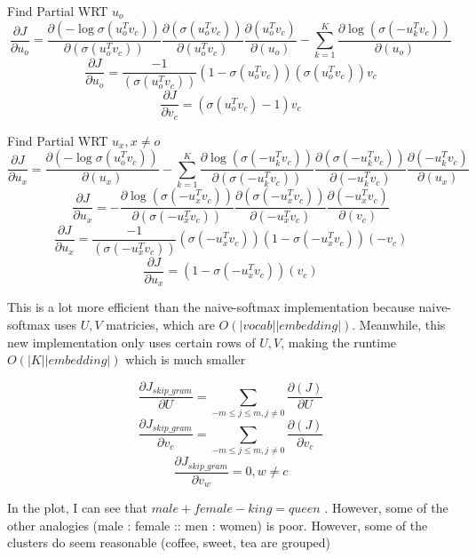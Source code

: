 \documentclass[11pt,largemargins]{homework}
\begin{document}
Find Partial WRT $u_o$ 
$$ \frac{\partial{J}}{\partial{u_o}} = \frac{\partial{(-\log{\sigma{(u_o^T v_c)}})}}{\partial{(\sigma{(u_o^T v_c)})}} \frac{{\partial{(\sigma{(u_o^T v_c)})}}}{\partial{(u_o^T v_c)}}\frac{\partial{(u_o^T v_c)}}{\partial{(u_o)}} - \sum_{k=1}^K \frac{\partial{\log{(\sigma{(-u_k^T v_c)})}}}{\partial{(u_o)}}
$$
$$ \frac{\partial{J}}{\partial{u_o}} = \frac{-1}{(\sigma{(u_o^T v_c)})} (1 - \sigma{(u_o^T v_c)})(\sigma{(u_o^T v_c)})v_c$$
$$ \frac{\partial{J}}{\partial{v_c}} = (\sigma{(u_o^T v_c)} - 1) v_c $$

Find Partial WRT $u_x, x \ne o$ 
$$ \frac{\partial{J}}{\partial{u_x}} = \frac{\partial{(-\log{\sigma{(u_o^T v_c)}})}}{\partial{(u_x)}} - \sum_{k=1}^K \frac{\partial{\log{(\sigma{(-u_k^T v_c)})}}}{\partial{(\sigma{(-u_k^T v_c)})}} \frac{\partial{(\sigma{(-u_k^T v_c)})}} {\partial{(-u_k^T v_c)}} \frac{\partial{(-u_k^T v_c)}}{\partial{(u_x)}}$$
$$ \frac{\partial{J}}{\partial{u_x}} = - \frac{\partial{\log{(\sigma{(-u_x^T v_c)})}}}{\partial{(\sigma{(-u_x^T v_c)})}} \frac{\partial{(\sigma{(-u_x^T v_c)})}} {\partial{(-u_x^T v_c)}} \frac{\partial{(-u_x^T v_c)}}{\partial{(v_c)}}$$
$$ \frac{\partial{J}}{\partial{u_x}} = \frac{-1}{(\sigma{(-u_x^T v_c)})} (\sigma{(-u_x^T v_c)})(1-\sigma{(-u_x^T v_c)}) (-v_c)$$
$$ \frac{\partial{J}}{\partial{u_x}} = (1- \sigma{(-u_x^T v_c)}) (v_c)$$


This is a lot more efficient than the naive-softmax implementation because naive-softmax uses $U, V$ matricies, which are $O(|vocab||embedding|)$. Meanwhile, this new implementation only uses certain rows of $U, V$, making the runtime $O(|K||embedding|)$ which is much smaller

\question

$$ \frac{\partial{J_{skip\_gram}}}{\partial{U}} = \sum_{-m \le j \le m, j \ne 0} \frac{\partial{(J)}}{\partial{U}}$$
$$ \frac{\partial{J_{skip\_gram}}}{\partial{v_c}} = \sum_{-m \le j \le m, j \ne 0} \frac{\partial{(J)}}{\partial{v_c}}$$
$$ \frac{\partial{J_{skip\_gram}}}{\partial{v_w}} = 0, w \ne c $$

\question
In the plot, I can see that $male + female - king = queen$ . However, some of the other analogies (male : female :: men : women) is poor. However, some of the clusters do seem reasonable (coffee, sweet, tea are grouped)
\end{document}
